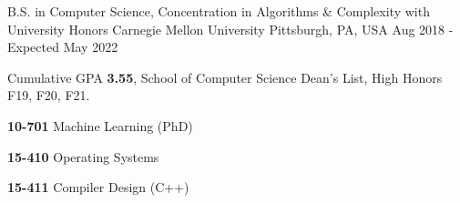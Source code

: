 

\begin{cventries}

  \eduentry
    {B.S. in Computer Science, Concentration in Algorithms \& Complexity
	with University Honors } %
    {Carnegie Mellon University} %
    {Pittsburgh, PA, USA} %
    {Aug 2018 - Expected May 2022} %
    {
      \begin{cvitems} %
      \item {Cumulative GPA \textbf{3.55}, School of Computer Science Dean's List, High Honors F19, F20, F21. }
      \item {}
        \setlength\multicolsep{0pt}
        \begin{multicols}{3}
          \item[] {\textbf{10-701} Machine Learning (PhD)}
          \item[] {\textbf{15-410} Operating Systems}
          \item[] {\textbf{15-411} Compiler Design (C++)}

\end{multicols}
\end{cvitems}}
\end{cventries}
